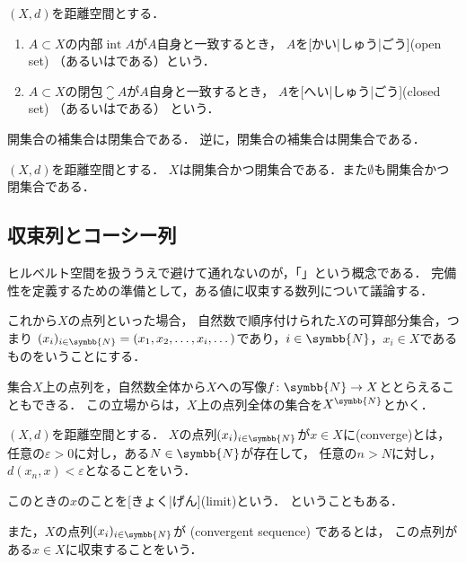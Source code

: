 \documentclass[../sotsu.tex]{subfiles}
\begin{document}
\begin{definition}[開集合と閉集合]
    \label{dfn:open-set-and-closed-set}
    \label{dfn:open-set}
    \label{dfn:closed-set}
    $(X, d)$を距離空間とする．
    \begin{enumerate}
        \item 
            $A \subset X$の内部$\operatorname{int} A$が$A$自身と一致するとき，
            $A$を[かい|しゅう|ごう](open set)
            （あるいはである）という．
        \item 
            $A \subset X$の閉包$\closure{A}$が$A$自身と一致するとき，
            $A$を[へい|しゅう|ごう](closed set)
            （あるいはである） という．
    \end{enumerate}
\end{definition}

開集合の補集合は閉集合である．
逆に，閉集合の補集合は開集合である．


\begin{example}
    $(X, d)$を距離空間とする．
    $X$は開集合かつ閉集合である．また$\emptyset$も開集合かつ閉集合である．
\end{example}



\subsection{収束列とコーシー列}

ヒルベルト空間を扱ううえで避けて通れないのが，「」という概念である．
完備性を定義するための準備として，ある値に収束する数列について議論する．

これから$X$の点列といった場合，
自然数で順序付けられた$X$の可算部分集合，つまり
$\sequ{x_i}[i \in \symbb{N}] = (x_1, x_2, \dots, x_i, \dotsc)$であり，$i \in \symbb{N}$，$x_i \in X$であるものをいうことにする．

集合$X$上の点列を，自然数全体から$X$への写像$f \colon \symbb{N} \to X$ととらえることもできる．
この立場からは，$X$上の点列全体の集合を$X^{\symbb{N}}$とかく．

\begin{definition}[収束列]
    \label{dfn:convergent-sequence}
    $(X, d)$を距離空間とする．
    $X$の点列$\sequ{x_i}[i \in \symbb{N}]$が$x \in X$に(converge)とは，
    任意の$\varepsilon > 0$に対し，ある$N \in \symbb{N}$が存在して，
    任意の$n > N$に対し，$d(x_n, x) < \varepsilon$となることをいう．
    
    このときの$x$のことを[きょく|げん](limit)という\cite{uchida-set-2020}．
    ということもある．

    また，$X$の点列$\sequ{x_i}[i \in \symbb{N}]$が%
    (convergent sequence)%
    であるとは，
    この点列がある$x \in X$に収束することをいう．
\end{definition}
\end{document}
